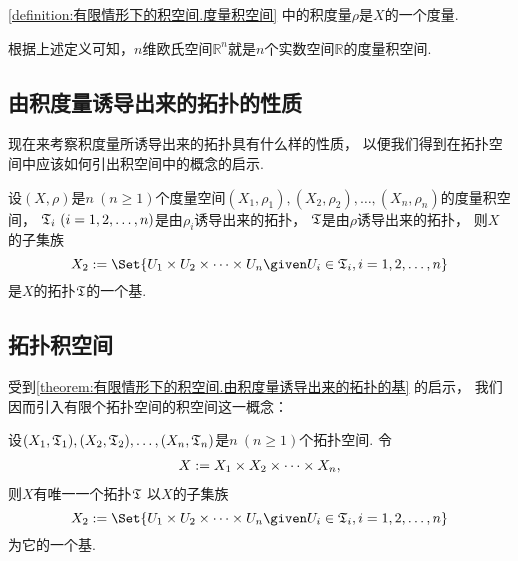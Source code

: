\begin{proposition}
\cref{definition:有限情形下的积空间.度量积空间} 中的积度量\(\rho\)是\(X\)的一个度量.
\end{proposition}

根据上述定义可知，\(n\)维欧氏空间\(\mathbb{R}^n\)就是\(n\)个实数空间\(\mathbb{R}\)的度量积空间.

\subsection{由积度量诱导出来的拓扑的性质}
现在来考察积度量所诱导出来的拓扑具有什么样的性质，
以便我们得到在拓扑空间中应该如何引出积空间中的概念的启示.
\begin{theorem}\label{theorem:有限情形下的积空间.由积度量诱导出来的拓扑的基}
\def\MatricSpaceCartesianProduct{(X_1,\rho_1),\allowbreak(X_2,\rho_2),\allowbreak\dotsc,\allowbreak(X_n,\rho_n)}
设\((X,\rho)\)是\(n\ (n\geq1)\)个度量空间\(\MatricSpaceCartesianProduct\)的度量积空间，
\(\T_i\ (i=1,2,\dotsc,n)\)是由\(\rho_i\)诱导出来的拓扑，
\({\mathfrak T}\)是由\(\rho\)诱导出来的拓扑，
则\(X\)的子集族\begin{equation*}
	\B \defeq \Set{
		U_1 \times U_2 \times \dotsb \times U_n
		\given
		U_i \in \T_i, i=1,2,\dotsc,n
	}
\end{equation*}
是\(X\)的拓扑\({\mathfrak T}\)的一个基.
\end{theorem}

\subsection{拓扑积空间}
受到\cref{theorem:有限情形下的积空间.由积度量诱导出来的拓扑的基} 的启示，
我们因而引入有限个拓扑空间的积空间这一概念：
\begin{theorem}\label{theorem:有限情形下的积空间.积拓扑存在且唯一}
\def\MatricSpaceCartesianProduct{(X_1,\T_1),\allowbreak(X_2,\T_2),\allowbreak\dotsc,\allowbreak(X_n,\T_n)}
设\(\MatricSpaceCartesianProduct\)是\(n\ (n\geq1)\)个拓扑空间.
令\begin{gather*}
	X := X_1 \times X_2 \times \dotsb \times X_n,
\end{gather*}
则\(X\)有唯一一个拓扑\({\mathfrak T}\)
以\(X\)的子集族\begin{equation*}
	\B \defeq \Set{
		U_1 \times U_2 \times \dotsb \times U_n
		\given
		U_i \in \T_i, i=1,2,\dotsc,n
	}
\end{equation*}
为它的一个基.
\end{theorem}

